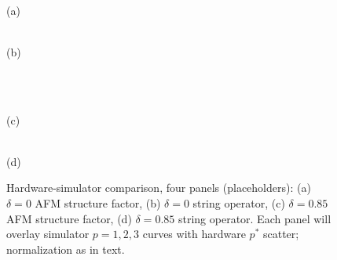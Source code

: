 \begin{figure}[htbp]
\centering
\begin{minipage}[b]{0.48\textwidth}
\centering
{}\\(a)
\end{minipage}
\hfill
\begin{minipage}[b]{0.48\textwidth}
\centering
{}\\(b)
\end{minipage}
\\
\begin{minipage}[b]{0.48\textwidth}
\centering
{}\\(c)
\end{minipage}
\hfill
\begin{minipage}[b]{0.48\textwidth}
\centering
{}\\(d)
\end{minipage}
\caption{Hardware-simulator comparison, four panels (placeholders):
(a) $\delta=0$ AFM structure factor, (b) $\delta=0$ string operator,
(c) $\delta=0.85$ AFM structure factor, (d) $\delta=0.85$ string
operator. Each panel will overlay simulator $p=1,2,3$ curves with
hardware $p^*$ scatter; normalization as in text. \label{fig:D08}}
\end{figure}
